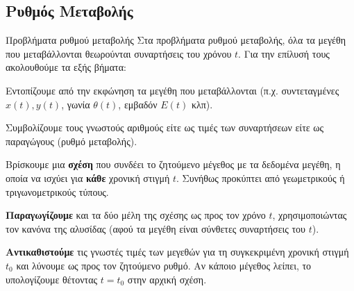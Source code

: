 \subsection{Ρυθμός Μεταβολής}
\begin{askhsh}{Προβλήματα ρυθμού μεταβολής}
Στα προβλήματα ρυθμού μεταβολής, όλα τα μεγέθη που μεταβάλλονται θεωρούνται συναρτήσεις του χρόνου $t$. Για την επίλυσή τους ακολουθούμε τα εξής βήματα:

\bhmata
\begin{bhma}
\item Εντοπίζουμε από την εκφώνηση τα μεγέθη που μεταβάλλονται (π.χ. συντεταγμένες $x(t), y(t)$, γωνία $\theta(t)$, εμβαδόν $E(t)$ κλπ).
\item Συμβολίζουμε τους γνωστούς αριθμούς είτε ως τιμές των συναρτήσεων είτε ως παραγώγους (ρυθμό μεταβολής).
\item Βρίσκουμε μια \textbf{σχέση} που συνδέει το ζητούμενο μέγεθος με τα δεδομένα μεγέθη, η οποία να ισχύει για \textbf{κάθε} χρονική στιγμή $t$. Συνήθως προκύπτει από γεωμετρικούς ή τριγωνομετρικούς τύπους.
\item \textbf{Παραγωγίζουμε} και τα δύο μέλη της σχέσης ως προς τον χρόνο $t$, χρησιμοποιώντας τον κανόνα της αλυσίδας (αφού τα μεγέθη είναι σύνθετες συναρτήσεις του $t$).
\item \textbf{Αντικαθιστούμε} τις γνωστές τιμές των μεγεθών για τη συγκεκριμένη χρονική στιγμή $t_0$ και λύνουμε ως προς τον ζητούμενο ρυθμό. Αν κάποιο μέγεθος λείπει, το υπολογίζουμε θέτοντας $t=t_0$ στην αρχική σχέση.
\end{bhma}
\end{askhsh}


